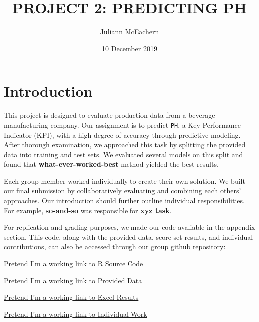 \documentclass[]{report}
\title{PROJECT 2: PREDICTING PH}
\author{Juliann McEachern}
\date{10 December 2019}
\begin{document}
\maketitle

{
\setcounter{tocdepth}{1}
\tableofcontents
}
\thispagestyle{empty}
\newpage
\clearpage
{}

\hypertarget{intro}{%
\chapter*{Introduction}\label{intro}}

This project is designed to evaluate production data from a beverage
manufacturing company. Our assignment is to predict \texttt{PH}, a Key
Performance Indicator (KPI), with a high degree of accuracy through
predictive modeling. After thorough examination, we approached this task
by splitting the provided data into training and test sets. We evaluated
several models on this split and found that
\textbf{what-ever-worked-best} method yielded the best results.

Each group member worked individually to create their own solution. We
built our final submission by collaboratively evaluating and combining
each others' approaches. Our introduction should further outline
individual responsibilities. For example, \textbf{so-and-so} was
responsible for \textbf{xyz task}.

For replication and grading purposes, we made our code avaliable in the
appendix section. This code, along with the provided data, score-set
results, and individual contributions, can also be accessed through our
group github repository:

\begin{compactitem}
  \item \href{https://github.com/JeremyOBrien16/CUNY_DATA_624/tree/master/Project_Two}{Pretend I'm a working link to R Source Code}
  \item \href{https://github.com/JeremyOBrien16/CUNY_DATA_624/tree/master/Project_Two}{Pretend I'm a working link to Provided Data}
  \item \href{https://github.com/JeremyOBrien16/CUNY_DATA_624/tree/master/Project_Two}{Pretend I'm a working link to Excel Results}
  \item \href{https://github.com/JeremyOBrien16/CUNY_DATA_624/tree/master/Project_Two}{Pretend I'm a working link to Individual Work}
\end{compactitem}
\end{document}
